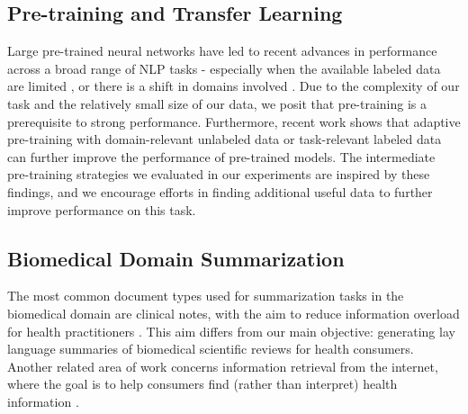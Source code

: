 \documentclass[letterpaper, table]{article} %
\begin{document}
\subsection{Pre-training and Transfer Learning}
Large pre-trained neural networks have led to recent advances in performance across a broad range of NLP tasks \cite{peters2018elmo, Radford2018ImprovingLU,Devlin2019BERTPO} - especially when the available labeled data are limited \cite{brown2020language}, or there is a shift in domains involved \cite{Hendrycks2020PretrainedTI}. Due to the complexity of our task and the relatively small size of our data, we posit that pre-training is a prerequisite to strong performance. Furthermore, recent work shows that adaptive pre-training with domain-relevant unlabeled data \cite{Gururangan2020DontSP} or task-relevant labeled data \cite{Pruksachatkun2020IntermediateTaskTL} can further improve the performance of pre-trained models. The intermediate pre-training strategies we evaluated in our experiments are inspired by these findings, and we encourage efforts in finding additional useful data to further improve performance on this task.
\subsection{Biomedical Domain Summarization}
The most common document types used for summarization tasks in the biomedical domain are clinical notes, with the aim to reduce information overload for health practitioners \cite{pivovarov2015automated, feblowitz2011summarization, molla2011development}. This aim differs from our main objective: generating lay language summaries of biomedical scientific reviews for health consumers. Another related area of work concerns information retrieval from the internet, where the goal is to help consumers find (rather than interpret) health information \cite{goeuriot2020overview}.


\end{document}
